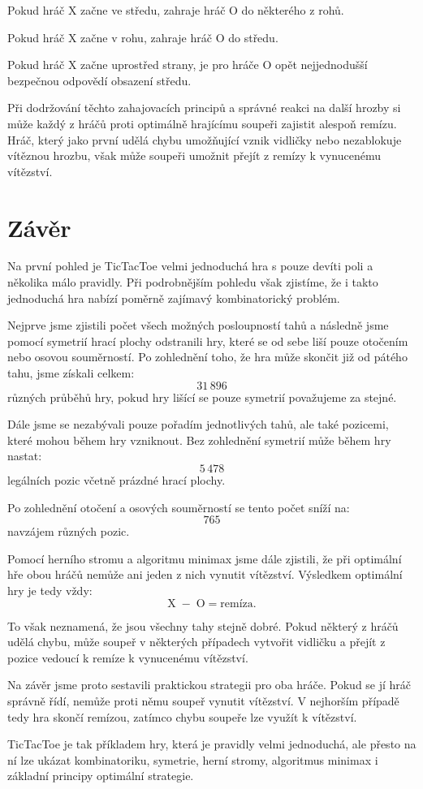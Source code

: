 \documentclass[12pt,a4paper]{article}
\begin{document}
Pokud hráč $\mathrm{X}$ začne ve středu, zahraje hráč $\mathrm{O}$ do některého z rohů.

Pokud hráč $\mathrm{X}$ začne v rohu, zahraje hráč $\mathrm{O}$ do středu.

Pokud hráč $\mathrm{X}$ začne uprostřed strany, 
je pro hráče $\mathrm{O}$ opět nejjednodušší bezpečnou odpovědí obsazení středu.

Při dodržování těchto zahajovacích principů 
a správné reakci na další hrozby si může každý 
z hráčů proti optimálně hrajícímu soupeři zajistit alespoň remízu.
Hráč, který jako první udělá chybu umožňující vznik vidličky 
nebo nezablokuje vítěznou hrozbu, 
však může soupeři umožnit přejít z remízy k vynucenému vítězství.

\section*{Závěr}

Na první pohled je TicTacToe velmi jednoduchá hra s pouze devíti poli a několika málo pravidly.
Při podrobnějším pohledu však zjistíme, že i takto jednoduchá hra nabízí poměrně zajímavý kombinatorický problém.

Nejprve jsme zjistili počet všech možných posloupností tahů a následně jsme pomocí symetrií hrací plochy odstranili hry, které se od sebe liší pouze otočením nebo osovou souměrností.
Po zohlednění toho, že hra může skončit již od pátého tahu, jsme získali celkem:
\[
    31\,896
\]
různých průběhů hry, pokud hry lišící se pouze symetrií považujeme za stejné.

Dále jsme se nezabývali pouze pořadím jednotlivých tahů, ale také pozicemi, které mohou během hry vzniknout.
Bez zohlednění symetrií může během hry nastat:
\[
    5\,478
\]
legálních pozic včetně prázdné hrací plochy.

Po zohlednění otočení a osových souměrností se tento počet sníží na:
\[
    765
\]
navzájem různých pozic.

Pomocí herního stromu a algoritmu minimax jsme dále zjistili, že při optimální hře obou hráčů nemůže ani jeden z nich vynutit vítězství.
Výsledkem optimální hry je tedy vždy:
\[
    \mathrm{X}\;-\;\mathrm{O}=\text{remíza}.
\]

To však neznamená, že jsou všechny tahy stejně dobré.
Pokud některý z hráčů udělá chybu, může soupeř v některých případech vytvořit vidličku a přejít z pozice vedoucí k remíze k vynucenému vítězství.

Na závěr jsme proto sestavili praktickou strategii pro oba hráče.
Pokud se jí hráč správně řídí, nemůže proti němu soupeř vynutit vítězství.
V nejhorším případě tedy hra skončí remízou, zatímco chybu soupeře lze využít k vítězství.

TicTacToe je tak příkladem hry, která je pravidly velmi jednoduchá, ale přesto na ní lze ukázat kombinatoriku, symetrie, herní stromy, algoritmus minimax i základní principy optimální strategie.
\end{document}
